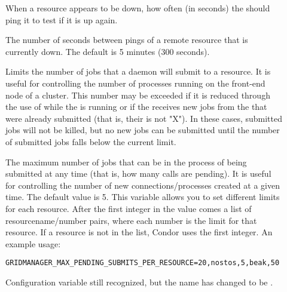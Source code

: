 \begin{description}
\item[]
\label{param:GridmanagerResourceProbeInterval}
When a resource appears to be down, how often (in seconds) the
should ping it to test if it is up again.

\item[]
\label{param:GridmanagerResourceProbeDelay} The number of seconds
between pings of a remote resource that is currently down. The default
is 5 minutes (300 seconds).

\item[]
\label{param:GridmanagerMaxSubmittedJobsPerResource}
Limits the number of jobs
that a  daemon will submit to a resource.
It is useful for controlling the number of 
processes running on the front-end node of a cluster.
This number may be exceeded if it is reduced through the use
of  while the  is running
or if the  receives new
jobs from the  that were already submitted
(that is, their  is not "X").
In these cases, submitted jobs will not be killed,
but no new jobs can be submitted until the number of submitted
jobs falls below the current limit.

\item[]
\label{param:GridmanagerMaxPendingSubmitsPerResource} The maximum
number of jobs
that can be in the process of being submitted at any time (that is,
how many  calls are pending).
It is useful for controlling the number of new
connections/processes created at a given time.
The default value is 5.
This variable allows
you to set different limits for each resource.
After the first integer in the value
comes a list of resourcename/number pairs,
where each number is the limit for that resource.
If a resource is not in the list,
Condor uses the first integer.
An example usage:
\begin{verbatim}
GRIDMANAGER_MAX_PENDING_SUBMITS_PER_RESOURCE=20,nostos,5,beak,50
\end{verbatim}

\item[]
\label{param:GridmanagerMaxPendingSubmits} Configuration variable
still recognized, but the name has changed to be
.


\end{description}
